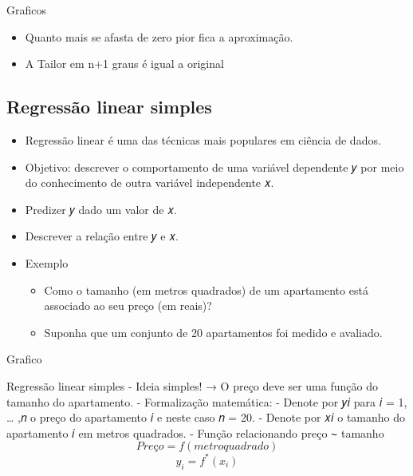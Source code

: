 \documentclass[
]{article}
\providecommand{\tightlist}{%
  \setlength{\itemsep}{0pt}\setlength{\parskip}{0pt}}
\begin{document}
Graficos

\begin{itemize}
\tightlist
\item
  Quanto mais se afasta de zero pior fica a aproximação.
\item
  A Tailor em n+1 graus é igual a original
\end{itemize}

\hypertarget{regressuxe3o-linear-simples}{%
\subsection{Regressão linear
simples}\label{regressuxe3o-linear-simples}}

\begin{itemize}
\tightlist
\item
  Regressão linear é uma das técnicas mais populares em ciência de
  dados.
\item
  Objetivo: descrever o comportamento de uma variável dependente 𝑦 por
  meio do conhecimento de outra variável independente 𝑥.
\item
  Predizer 𝑦 dado um valor de 𝑥.
\item
  Descrever a relação entre 𝑦 e 𝑥.
\item
  Exemplo

  \begin{itemize}
  \tightlist
  \item
    Como o tamanho (em metros quadrados) de um apartamento está
    associado ao seu preço (em reais)?
  \item
    Suponha que um conjunto de 20 apartamentos foi medido e avaliado.
  \end{itemize}
\end{itemize}

Grafico

Regressão linear simples - Ideia simples! → O preço deve ser uma função
do tamanho do apartamento. - Formalização matemática: - Denote por 𝑦𝑖
para 𝑖 = 1, \ldots{} ,𝑛 o preço do apartamento 𝑖 e neste caso 𝑛 = 20. -
Denote por 𝑥𝑖 o tamanho do apartamento 𝑖 em metros quadrados. - Função
relacionando preço ∼ tamanho \[ Preço = f(metroquadrado) \]
\[ y_{i} = f^{*}(x_{i})\]
\end{document}
